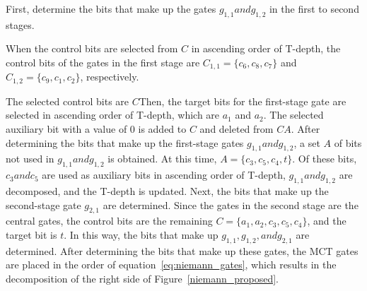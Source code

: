 First, determine the bits that make up the gates $g_{1,1} and g_{1,2}$ in the first to second stages.

When the control bits are selected from $C$ in ascending order of T-depth,
the control bits of the gates in the first stage are $C_{1,1}=\{c_{6}, c_{8}, c_{7}\}$ and $C_{1,2}=\{c_{9}, c_{1}, c_{2}\}$, respectively.

The selected control bits are $C$Then, the target bits for the first-stage gate are selected in ascending order of T-depth, which are $a_{1}$ and $a_{2}$.
The selected auxiliary bit with a value of 0 is added to $C$ and deleted from $CA$.
After determining the bits that make up the first-stage gates $g_{1,1} and g_{1,2}$,
a set $A$ of bits not used in $g_{1,1} and g_{1,2}$ is obtained.
At this time, $A=\{c_{3}, c_{5}, c_{4}, t\}$.
Of these bits, $c_{3} and c_{5}$ are used as auxiliary bits in ascending order of T-depth, $g_{1,1} and g_{1,2}$ are decomposed, and the T-depth is updated.
Next, the bits that make up the second-stage gate $g_{2,1}$ are determined.
Since the gates in the second stage are the central gates,
the control bits are the remaining $C=\{a_{1},a_{2}, c_{3},c_{5},c_{4}\}$,
and the target bit is $t$.
In this way, the bits that make up $g_{1,1}, g_{1,2}, and g_{2,1}$ are determined.
After determining the bits that make up these gates,
the MCT gates are placed in the order of equation~\ref{eq:niemann_gates},
which results in the decomposition of the right side of Figure~\ref{niemann_proposed}.
\par
{}

